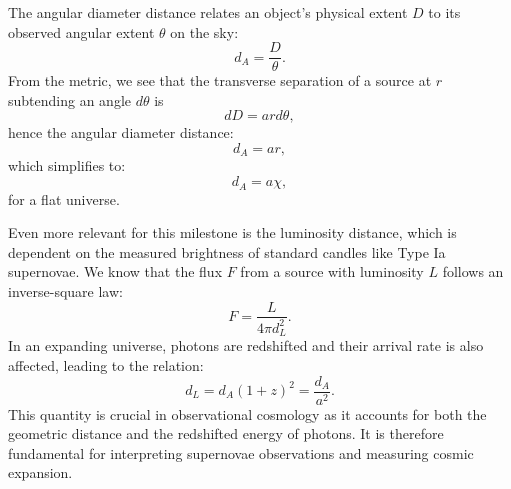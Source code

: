 \documentclass{aa}
\begin{document}
The angular diameter distance relates an object's physical extent $D$ to its observed angular extent $\theta$ on the sky:
\begin{equation}
d_A = \frac{D}{\theta}.
\end{equation}
From the metric, we see that the transverse separation of a source at $r$ subtending an angle $d\theta$ is
\begin{equation}
  dD = a r d\theta,
\end{equation}
hence the angular diameter distance:
\begin{equation}
  d_A = a r,
\end{equation}
which simplifies to:
\begin{equation}
  d_A = a \chi,
\end{equation}
for a flat universe.

Even more relevant for this milestone is the luminosity distance, which is dependent on the measured brightness of standard candles like Type Ia supernovae. We know that the flux $F$ from a source with luminosity $L$ follows an inverse-square law:
\begin{equation}
  F = \frac{L}{4\pi d_L^2}.
\end{equation}
In an expanding universe, photons are redshifted and their arrival rate is also affected, leading to the relation:
\begin{equation}
  d_L = d_A (1 + z)^2 = \frac{d_A}{a^2}.
\end{equation}
This quantity is crucial in observational cosmology as it accounts for both the geometric distance and the redshifted energy of photons. It is therefore fundamental for interpreting supernovae observations and measuring cosmic expansion.
\end{document}
